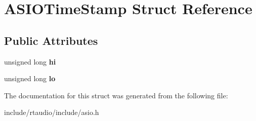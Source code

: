 \hypertarget{struct_a_s_i_o_time_stamp}{}\section{A\+S\+I\+O\+Time\+Stamp Struct Reference}
\label{struct_a_s_i_o_time_stamp}
\subsection*{Public Attributes}
\begin{DoxyCompactItemize}
\item 
unsigned long {\bfseries hi}\hypertarget{struct_a_s_i_o_time_stamp_abd843dd89f5047845ec0cd05c4fca879}{}\label{struct_a_s_i_o_time_stamp_abd843dd89f5047845ec0cd05c4fca879}

\item 
unsigned long {\bfseries lo}\hypertarget{struct_a_s_i_o_time_stamp_a9862ffba12ceaf8083890cb14a3bcac6}{}\label{struct_a_s_i_o_time_stamp_a9862ffba12ceaf8083890cb14a3bcac6}

\end{DoxyCompactItemize}


The documentation for this struct was generated from the following file\+:\begin{DoxyCompactItemize}
\item 
include/rtaudio/include/asio.\+h\end{DoxyCompactItemize}
